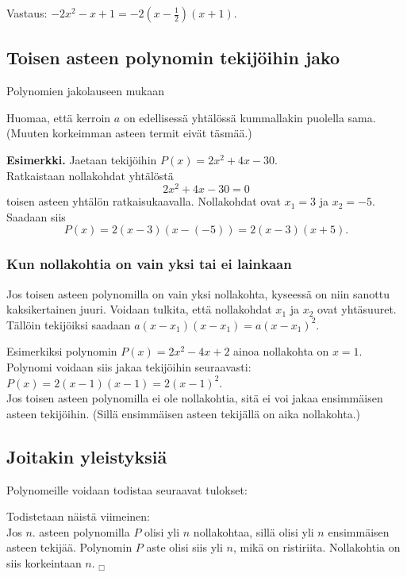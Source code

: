 Vastaus: $-2x^2-x+1 = -2(x-\frac{1}{2})(x+1)$.

\subsection*{Toisen asteen polynomin tekijöihin jako}

Polynomien jakolauseen mukaan

Huomaa, että kerroin $a$ on edellisessä yhtälössä kummallakin puolella sama.
(Muuten korkeimman asteen termit eivät täsmää.)

\textbf{Esimerkki.}
Jaetaan tekijöihin $P(x)=2x^2 + 4x-30$. \\
Ratkaistaan nollakohdat yhtälöstä $$2x^2 + 4x-30=0$$ toisen asteen yhtälön ratkaisukaavalla.
Nollakohdat ovat $x_1=3$ ja $x_2=-5$. Saadaan siis
$$P(x)= 2(x-3)(x-(-5)) = 2(x-3)(x+5).$$

\subsubsection*{Kun nollakohtia on vain yksi tai ei lainkaan}
Jos toisen asteen polynomilla on vain yksi nollakohta, kyseessä on niin sanottu kaksikertainen juuri. Voidaan tulkita, että nollakohdat $x_1$ ja $x_2$ ovat yhtäsuuret. Tällöin tekijöiksi saadaan $a(x-x_1)(x-x_1)=a(x-x_1)^2$.

Esimerkiksi polynomin $P(x)=2x^2-4x+2$ ainoa nollakohta on $x=1$. Polynomi voidaan siis jakaa tekijöihin seuraavasti: \\ $P(x)=2(x-1)(x-1)=2(x-1)^2$. \\

Jos toisen asteen polynomilla ei ole nollakohtia, sitä ei voi jakaa ensimmäisen asteen tekijöihin. (Sillä ensimmäisen asteen tekijällä on aika nollakohta.)

\subsection*{Joitakin yleistyksiä}

Polynomeille voidaan todistaa seuraavat tulokset:

Todistetaan näistä viimeinen: \\
Jos $n$. asteen polynomilla $P$ olisi yli $n$ nollakohtaa, sillä olisi yli $n$ ensimmäisen asteen
tekijää. Polynomin $P$ aste olisi siis yli $n$, mikä on ristiriita. Nollakohtia on siis
korkeintaan $n$. $_\Box$

